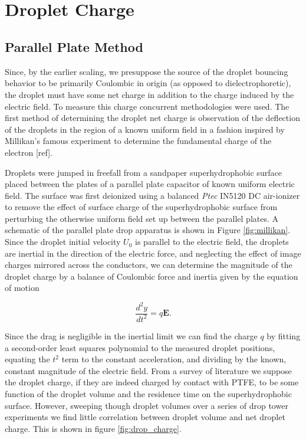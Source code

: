 \documentclass[a4paper, 12pt]{article}
\begin{document}
\section{\\Droplet Charge} \label{sec.drop_charge}
\subsection*{Parallel Plate Method}
Since, by the earlier scaling, we presuppose the source of the droplet bouncing behavior to be primarily Coulombic in origin (as opposed to dielectrophoretic), the droplet must have some net charge in addition to the charge induced by the electric field. To measure this charge concurrent methodologies were used. The first method of determining the droplet net charge is observation of the deflection of the droplets in the region of a known uniform field in a fashion inspired by Millikan's famous experiment to determine the fundamental charge of the electron [ref].

Droplets were jumped in freefall from a sandpaper superhydrophobic surface placed between the plates of a parallel plate capacitor of known uniform electric field. The surface was first deionized using a balanced \emph{Ptec} IN5120 DC air-ionizer to remove the effect of surface charge of the superhydrophobic surface from perturbing the otherwise uniform field set up between the parallel plates. A schematic of the parallel plate drop apparatus is shown in Figure \ref{fig:millikan}. Since the droplet initial velocity $U_0$ is parallel to the electric field, the droplets are inertial in the direction of the electric force, and neglecting the effect of image charges mirrored across the conductors, we can determine the magnitude of the droplet charge by a balance of Coulombic force and inertia given by the equation of motion

\[ \frac{d^2y}{dt^2} = q\mathbf{E}. \]

Since the drag is negligible in the inertial limit we can find the charge $q$ by fitting a second-order least squares polynomial to the measured droplet positions, equating the $t^2$ term to the constant acceleration, and dividing by the known, constant magnitude of the electric field. From a survey of literature we suppose the droplet charge, if they are indeed charged by contact with PTFE, to be some function of the droplet volume and the residence time on the superhydrophobic surface. However, sweeping though droplet volumes over a series of drop tower experiments we find little correlation between droplet volume  and net droplet charge. This is shown in figure \ref{fig:drop_charge}.
\end{document}

